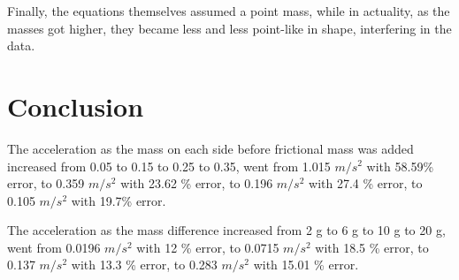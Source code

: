\documentclass[11pt, titlepage]{article}
\begin{document}
Finally, the equations themselves assumed a point mass, while in actuality, as the masses got higher, they became less and less point-like in shape, interfering in the data.

\section*{Conclusion}

The acceleration as the mass on each side before frictional mass was added increased from 0.05 to 0.15 to 0.25 to 0.35, went from 1.015 $m/s^2$ with 58.59\% error, to 0.359 $m/s^2$ with 23.62 \% error, to 0.196 $m/s^2$ with 27.4 \% error, to 0.105 $m/s^2$ with 19.7\% error.

The acceleration as the mass difference increased from 2 g to 6 g to 10 g to 20 g, went from 0.0196 $m/s^2$ with 12 \% error, to 0.0715 $m/s^2$ with 18.5 \% error, to 0.137 $m/s^2$ with 13.3 \% error, to 0.283 $m/s^2$ with 15.01 \% error. 
\end{document}
